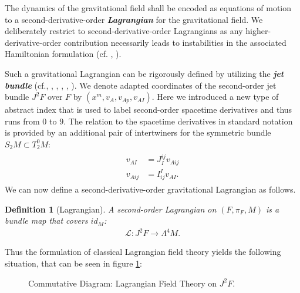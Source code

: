 \documentclass[%
preprint,
titlepage,
nofootinbib,
amsmath,amssymb,
showkeys,
aps,
prd,
floatfix,
]{revtex4-2}
\newtheorem{definition}{Definition}
\begin{document}
The dynamics of the gravitational field shall be encoded as equations of motion to a second-derivative-order \textit{\textbf{Lagrangian}} for the gravitational field. We deliberately restrict to second-derivative-order Lagrangians as any higher-derivative-order contribution necessarily
leads to instabilities in the associated Hamiltonian formulation (cf. \cite{Ostrogradsky:1850fid}, \cite{2015arXiv150602210W}). 

Such a gravitational Lagrangian can be rigorously defined by utilizing the \textit{\textbf{jet bundle}} (cf.\cite{saunders_1989}, \cite{seiler1994analysis}, \cite{seiler2009involution}, \cite{kolar1993natural}, \cite{Gotay1992StressEnergyMomentumTA}, \cite{1998physics...1019G}). 
We denote adapted coordinates of the second-order jet bundle $J^2F$ over $F$ by $(x^m, v_A, v_{Ap}, v_{AI})$. Here we introduced a new type of abstract index that is used to label second-order spacetime derivatives and thus runs from $0$ to $9$. 
The relation to the spacetime derivatives in standard notation is provided by an additional pair of intertwiners for the symmetric bundle $S_2M\subset T^0_2M$:
\begin{align}
    \begin{aligned}
        v_{AI} &= J_I^{ij} v_{Aij}\\
    v_{Aij} &= I^I_{ij} v_{AI}.
    \end{aligned}
\end{align}
We can now define a second-derivative-order gravitational Lagrangian as follows.
\begin{definition}[Lagrangian]
A second-order Lagrangian on $(F,\pi_F,M)$ is a bundle map that covers $id_M$:
\begin{align}
    \mathcal{L} : J^2F \longrightarrow \Lambda^4M.
\end{align}
\end{definition}
Thus the formulation of classical Lagrangian field theory yields the following situation, that can be seen in figure \ref{diagram1}:
\begin{figure}[hbt!]
\centering
{}
\caption{Commutative Diagram: Lagrangian Field Theory on $J^2F$.} \label{diagram1}
\end{figure}
\end{document}
